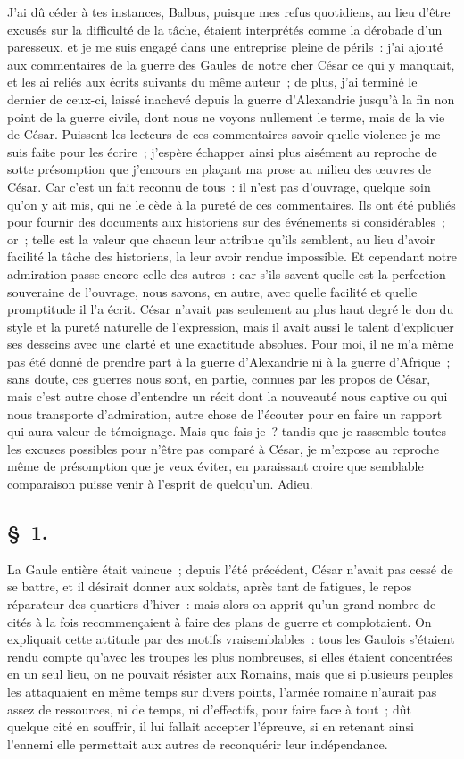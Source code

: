 \documentclass[french,twoside]{book} %
\begin{document}
\noindent J'ai dû céder à tes instances, Balbus, puisque mes refus quotidiens, au lieu d’être excusés sur la difficulté de la tâche, étaient interprétés comme la dérobade d’un paresseux, et je me suis engagé dans une entreprise pleine de périls : j’ai ajouté aux commentaires de la guerre des Gaules de notre cher César ce qui y manquait, et les ai reliés aux écrits suivants du même auteur ; de plus, j’ai terminé le dernier de ceux-ci, laissé inachevé depuis la guerre d’Alexandrie jusqu’à la fin non point de la guerre civile, dont nous ne voyons nullement le terme, mais de la vie de César. Puissent les lecteurs de ces commentaires savoir quelle violence je me suis faite pour les écrire ; j’espère échapper ainsi plus aisément au reproche de sotte présomption que j’encours en plaçant ma prose au milieu des œuvres de César. Car c’est un fait reconnu de tous : il n’est pas d’ouvrage, quelque soin qu’on y ait mis, qui ne le cède à la pureté de ces commentaires. Ils ont été publiés pour fournir des documents aux historiens sur des événements si considérables ; or ; telle est la valeur que chacun leur attribue qu’ils semblent, au lieu d’avoir facilité la tâche des historiens, la leur avoir rendue impossible. Et cependant notre admiration passe encore celle des autres : car s’ils savent quelle est la perfection souveraine de l’ouvrage, nous savons, en autre, avec quelle facilité et quelle promptitude il l’a écrit. César n’avait pas seulement au plus haut degré le don du style et la pureté naturelle de l’expression, mais il avait aussi le talent d’expliquer ses desseins avec une clarté et une exactitude absolues. Pour moi, il ne m’a même pas été donné de prendre part à la guerre d’Alexandrie ni à la guerre d’Afrique ; sans doute, ces guerres nous sont, en partie, connues par les propos de César, mais c’est autre chose d’entendre un récit dont la nouveauté nous captive ou qui nous transporte d’admiration, autre chose de l’écouter pour en faire un rapport qui aura valeur de témoignage. Mais que fais-je ? tandis que je rassemble toutes les excuses possibles pour n’être pas comparé à César, je m’expose au reproche même de présomption que je veux éviter, en paraissant croire que semblable comparaison puisse venir à l’esprit de quelqu’un. Adieu.\par
\subsection[{§ 1.}]{ \textsc{§ 1.} }
\noindent La Gaule entière était vaincue ; depuis l’été précédent, César n’avait pas cessé de se battre, et il désirait donner aux soldats, après tant de fatigues, le repos réparateur des quartiers d’hiver : mais alors on apprit qu’un grand nombre de cités à la fois recommençaient à faire des plans de guerre et complotaient. On expliquait cette attitude par des motifs vraisemblables : tous les Gaulois s’étaient rendu compte qu’avec les troupes les plus nombreuses, si elles étaient concentrées en un seul lieu, on ne pouvait résister aux Romains, mais que si plusieurs peuples les attaquaient en même temps sur divers points, l’armée romaine n’aurait pas assez de ressources, ni de temps, ni d’effectifs, pour faire face à tout ; dût quelque cité en souffrir, il lui fallait accepter l’épreuve, si en retenant ainsi l’ennemi elle permettait aux autres de reconquérir leur indépendance.
\end{document}

